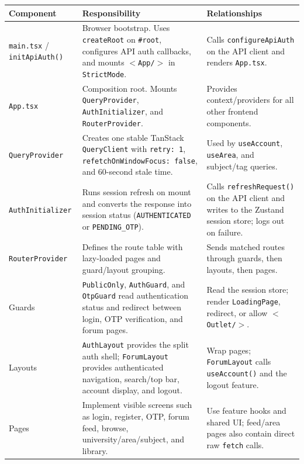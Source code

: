 \documentclass[12pt]{article}
\renewcommand{\baselinestretch}{1.5}
\begin{document}
\begingroup
\small
\renewcommand{\baselinestretch}{1.0}\selectfont
\renewcommand{\arraystretch}{1.15}
\setlength{\tabcolsep}{6pt}
\begin{longtable}{|>{\raggedright\arraybackslash}p{}|>{\raggedright\arraybackslash}p{}|>{\raggedright\arraybackslash}p{}|}
\hline
\textbf{Component} & \textbf{Responsibility} & \textbf{Relationships} \\ \hline
\endhead
\texttt{main.tsx} / \texttt{initApiAuth()} & Browser bootstrap. Uses \texttt{createRoot} on \texttt{\#root}, configures API auth callbacks, and mounts \texttt{$<$App/$>$} in \texttt{StrictMode}. & Calls \texttt{configureApiAuth} on the API client and renders \texttt{App.tsx}. \\ \hline
\texttt{App.tsx} & Composition root. Mounts \texttt{QueryProvider}, \texttt{AuthInitializer}, and \texttt{RouterProvider}. & Provides context/providers for all other frontend components. \\ \hline
\texttt{QueryProvider} & Creates one stable TanStack \texttt{QueryClient} with \texttt{retry: 1}, \texttt{refetchOnWindowFocus: false}, and 60-second stale time. & Used by \texttt{useAccount}, \texttt{useArea}, and subject/tag queries. \\ \hline
\texttt{AuthInitializer} & Runs session refresh on mount and converts the response into session status (\texttt{AUTHENTICATED} or \texttt{PENDING\_OTP}). & Calls \texttt{refreshRequest()} on the API client and writes to the Zustand session store; logs out on failure. \\ \hline
\texttt{RouterProvider} & Defines the route table with lazy-loaded pages and guard/layout grouping. & Sends matched routes through guards, then layouts, then pages. \\ \hline
Guards & \texttt{PublicOnly}, \texttt{AuthGuard}, and \texttt{OtpGuard} read authentication status and redirect between login, OTP verification, and forum pages. & Read the session store; render \texttt{LoadingPage}, redirect, or allow \texttt{$<$Outlet/$>$}. \\ \hline
Layouts & \texttt{AuthLayout} provides the split auth shell; \texttt{ForumLayout} provides authenticated navigation, search/top bar, account display, and logout. & Wrap pages; \texttt{ForumLayout} calls \texttt{useAccount()} and the logout feature. \\ \hline
Pages & Implement visible screens such as login, register, OTP, forum feed, browse, university/area/subject, and library. & Use feature hooks and shared UI; feed/area pages also contain direct raw \texttt{fetch} calls. \\ \hline

\end{longtable}
\end{document}

